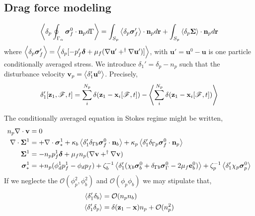 \documentclass[12pt]{My_preprint}
\begin{document}
\subsection{Drag force modeling}
\begin{equation}
    \left<\delta_{p} \oint_{\Gamma_{\alpha}} \bm\sigma_f^0 \cdot \textbf{n}_p d\Gamma\right>
    =
    \int_{S_p}
    \left<\delta_{p} \bm\sigma_f' \right>
    \cdot \textbf{n}_p
    d\textbf{r}
    +
    \int_{S_p}
    \left<\delta_{p} \bm\Sigma\right>
    \cdot \textbf{n}_p
    d\textbf{r}
\end{equation}
where $\left<\delta_{p} \bm\sigma_f'\right> = \left<\delta_{p} [-p_f'\bm\delta + \mu_f (\mathbf{\nabla} \textbf{u}'+^\dagger \mathbf{\nabla} \textbf{u}')]\right>$, with $\textbf{u}' = \textbf{u}^0 - \textbf{u}$ is one particle conditionally averaged stress. 
We introduce $\delta_1' = \delta_p - n_p$ such that the disturbance velocity $\textbf{v}_p = \left<\delta_1' \textbf{u}^0\right>$. 
Precisely, 
\begin{equation}
    \delta_1'[\textbf{z}_1,\mathscr{F},t] 
    = 
    \sum_i^{N_p}\delta(\textbf{z}_1 - \textbf{x}_i[\mathscr{F},t]) - 
    \left<\sum_i^{N_p}\delta(\textbf{z}_1 - \textbf{x}_i[\mathscr{F},t])\right>
\end{equation}

The conditionally averaged equation in Stokes regime might be written, 
\begin{align}
    n_p \mathbf{\nabla}\cdot \textbf{v} &= 0 \\
    \mathbf{\nabla}\cdot \bm\Sigma^1
    &= 
    + \mathbf{\nabla}\cdot \bm\sigma^1_*
    +\kappa_b  \left<\delta_1' \delta_{\Gamma b}  \bm\sigma_f^0 \cdot \textbf{n}_b \right>
    +\kappa_p  \left<\delta_1' \delta_{\Gamma p}  \bm\sigma_f^0 \cdot \textbf{n}_p \right>\\
    \bm\Sigma^1
    &=
    -n_p p_f^1\bm\delta
    + \mu_f n_p (\mathbf{\nabla} \textbf{v}+^\dagger \mathbf{\nabla} \textbf{v})\\
    \bm\sigma^1_*
    &=
    + n_p (\phi_d^1 p_f^1 - \phi_d p_f )
    +\zeta_b^{-1} \left<\delta_1' (\chi_b \bm\sigma_b^0 + \delta_{\Gamma b} \bm\sigma_\Gamma^0 - 2\mu_f \textbf{e}_b^0 )  \right>
    +\zeta_p^{-1} \left<\delta_1' \chi_p \bm\sigma_p^0 \right>
\end{align}
If we neglecte the $\mathcal{O}(\phi_p^2,\phi_b^2)$ and $\mathcal{O}(\phi_p\phi_b)$ we may stipulate that,
\begin{align*}
    \left<\delta'_1 \delta_{b}\right>
    &= \mathcal{O}(n_p n_b)\\
    \left<\delta'_1 \delta_{p}\right>
    &=
    \delta(\textbf{z}_1 - \textbf{x}) n_p
    + \mathcal{O}(n_p^2)
\end{align*} 
\end{document}
